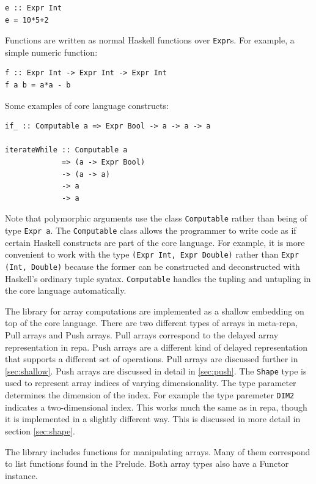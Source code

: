\documentclass[preprint]{sigplanconf}
\begin{document}
\begin{verbatim}
e :: Expr Int
e = 10*5+2
\end{verbatim}

Functions are written as normal Haskell functions over \texttt{Expr}s.
For example, a simple numeric function:

\begin{verbatim}
f :: Expr Int -> Expr Int -> Expr Int
f a b = a*a - b
\end{verbatim}

Some examples of core language constructs:

\begin{verbatim}
if_ :: Computable a => Expr Bool -> a -> a -> a

iterateWhile :: Computable a 
             => (a -> Expr Bool)
             -> (a -> a) 
             -> a
             -> a
\end{verbatim}

Note that polymorphic arguments use the class \texttt{Computable} rather
than being of type \texttt{Expr a}. The \texttt{Computable} class allows
the programmer to write code as if certain Haskell constructs are part
of the core language. For example, it is more convenient to work with
the type \texttt{(Expr Int, Expr Double)} rather than
\texttt{Expr (Int, Double)} because the former can be constructed and
deconstructed with Haskell's ordinary tuple syntax. \texttt{Computable}
handles the tupling and untupling in the core language automatically.

The library for array computations are implemented as a shallow
embedding on top of the core language. There are two different types of
arrays in meta-repa, Pull arrays and Push arrays. Pull arrays correspond
to the delayed array representation in repa. Push arrays are a different
kind of delayed representation that supports a different set of
operations. Pull arrays are discussed further in \ref{sec:shallow}. Push
arrays are discussed in detail in \ref{sec:push}. The \texttt{Shape}
type is used to represent array indices of varying dimensionality. The
type parameter determines the dimension of the index. For example the
type paremeter \texttt{DIM2} indicates a two-dimensional index. This
works much the same as in repa, though it is implemented in a slightly
different way. This is discussed in more detail in section
\ref{sec:shape}.

The library includes functions for manipulating arrays. Many of them
correspond to list functions found in the Prelude. Both array types also
have a Functor instance.
\end{document}
